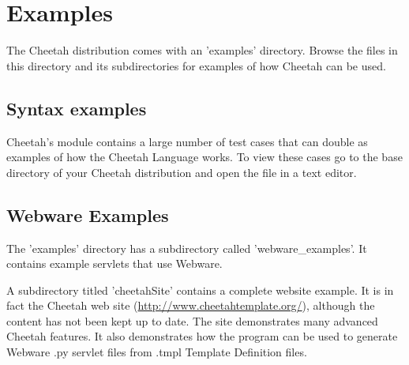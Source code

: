 \section{Examples}
\label{examples}

The Cheetah distribution comes with an 'examples' directory.  Browse the
files in this directory and its subdirectories for examples of how
Cheetah can be used.

\subsection{Syntax examples}
Cheetah's  module contains a large number of test cases that can
double as examples of how the Cheetah Language works.  To view these cases go to
the base directory of your Cheetah distribution and open the file
 in a text editor.


\subsection{Webware Examples}
The 'examples' directory has a subdirectory called 'webware\_examples'.  It
contains example servlets that use Webware.  

A subdirectory titled 'cheetahSite' contains a complete website example. It
is in fact the Cheetah web site
(\url{http://www.cheetahtemplate.org/}), although the content has not been kept
up to date.  The site demonstrates many advanced Cheetah features.  It also
demonstrates how the  program can be used to generate
Webware .py servlet files from .tmpl Template Definition files.


